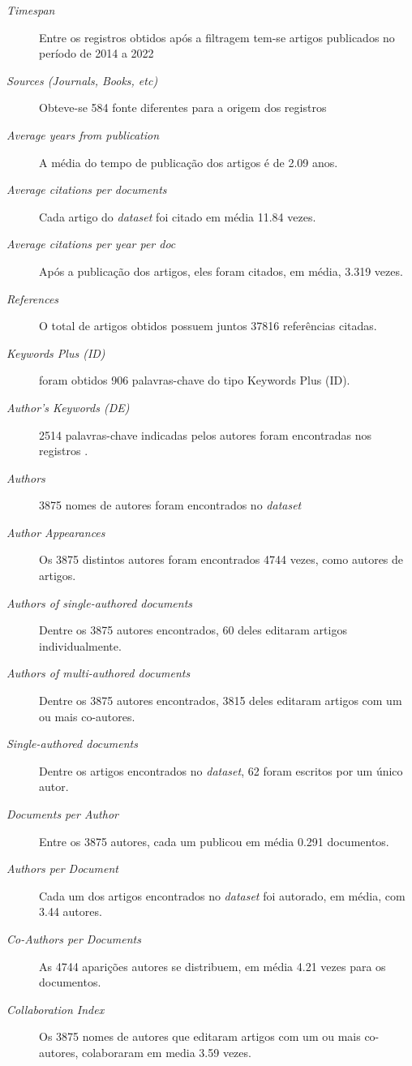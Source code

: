 \begin{description}
    \item [\textit{Timespan}] Entre os registros obtidos após a filtragem tem-se artigos publicados no período de 2014 a 2022
    \item [\textit{Sources (Journals, Books, etc)}] Obteve-se 584 fonte diferentes para a origem dos registros
    \item [\textit{Average years from publication}] A média do tempo de publicação dos artigos é de 2.09 anos.
    \item [\textit{Average citations per documents}] Cada artigo do \textit{dataset} foi citado em média 11.84 vezes.
    \item [\textit{Average citations per year per doc}] Após a publicação dos artigos, eles foram citados, em média, 3.319 vezes.
    \item [\textit{References}] O total de artigos obtidos possuem juntos 37816 referências citadas.
    \item [\textit{Keywords Plus (ID)}] foram obtidos 906 palavras-chave do tipo Keywords Plus (ID).
    \item [\textit{Author's Keywords (DE)}] 2514 palavras-chave indicadas pelos autores foram encontradas nos registros  .
    \item [\textit{Authors}] 3875 nomes de autores foram encontrados no \textit{dataset}  
    \item [\textit{Author Appearances}] Os 3875 distintos autores foram encontrados 4744 vezes, como autores de artigos.
    \item [\textit{Authors of single-authored documents}] Dentre os 3875 autores encontrados, 60 deles editaram artigos individualmente.
    \item [\textit{Authors of multi-authored documents}] Dentre os 3875 autores encontrados, 3815 deles editaram artigos com um ou mais co-autores.
    \item [\textit{Single-authored documents}] Dentre os artigos encontrados no \textit{dataset}, 62 foram escritos por um único autor.
    \item [\textit{Documents per Author}] Entre os 3875 autores, cada um publicou em média 0.291 documentos.
    \item [\textit{Authors per Document}] Cada um dos artigos encontrados no \textit{dataset} foi autorado, em média, com 3.44 autores.
    \item [\textit{Co-Authors per Documents}] As 4744 aparições autores se distribuem, em média 4.21 vezes para os documentos.
    \item [\textit{Collaboration Index}] Os 3875 nomes de autores que editaram artigos com um ou mais co-autores, colaboraram em media 3.59 vezes.
\end{description}

